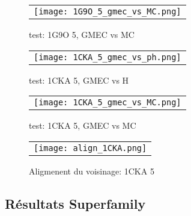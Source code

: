     
    \begin{figure}[h]
      \centering
      \begin{tabular}{c} 
        \texttt{[image: 1G9O\_5\_gmec\_vs\_MC.png]} 
      \end{tabular}
      
      \caption{test: 1G9O 5, GMEC vs MC}
\label{image:1G9O_5_GMEC_vs_MC}
    \end{figure}
    
    \begin{figure}[h]
      \centering
      \begin{tabular}{c} 
        \texttt{[image: 1CKA\_5\_gmec\_vs\_ph.png]} 
      \end{tabular}
      
      \caption{test: 1CKA 5, GMEC vs H}
\label{image:1CKA_5_GMEC_vs_H}
    \end{figure}

    \begin{figure}[h]
      \centering
      \begin{tabular}{c} 
        \texttt{[image: 1CKA\_5\_gmec\_vs\_MC.png]} 
      \end{tabular}
      
      \caption{test: 1CKA 5, GMEC vs MC}
\label{image:1CKA_5_GMEC_vs_MC}
    \end{figure}
    
    \clearpage


    \begin{figure}[h]
      \centering
      \begin{tabular}{c} 
        \texttt{[image: align\_1CKA.png]} 
      \end{tabular}
      
      \caption{Aligmenent du voisinage: 1CKA 5}
\label{image:Align_Suboptimal}
    \end{figure}




   \subsection{Résultats Superfamily}


